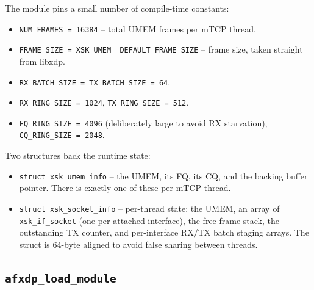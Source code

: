 \documentclass[10pt, letterpaper, twocolumn]{article}
\begin{document}
The module pins a small number of compile-time constants:
\begin{itemize}
    \item \texttt{NUM\_FRAMES = 16384} -- total UMEM frames per mTCP thread.
    \item \texttt{FRAME\_SIZE = XSK\_UMEM\_\_DEFAULT\_FRAME\_SIZE} -- frame size, taken straight from libxdp.
    \item \texttt{RX\_BATCH\_SIZE = TX\_BATCH\_SIZE = 64}.
    \item \texttt{RX\_RING\_SIZE = 1024}, \texttt{TX\_RING\_SIZE = 512}.
    \item \texttt{FQ\_RING\_SIZE = 4096} (deliberately large to avoid RX starvation), \texttt{CQ\_RING\_SIZE = 2048}.
\end{itemize}
Two structures back the runtime state:
\begin{itemize}
    \item \texttt{struct xsk\_umem\_info} -- the UMEM, its FQ, its CQ, and the backing buffer pointer. There is exactly one of these per mTCP thread.
    \item \texttt{struct xsk\_socket\_info} -- per-thread state: the UMEM, an array of \texttt{xsk\_if\_socket} (one per attached interface), the free-frame stack, the outstanding TX counter, and per-interface RX/TX batch staging arrays. The struct is 64-byte aligned to avoid false sharing between threads.
\end{itemize}

\subsection{\texttt{afxdp\_load\_module}}
\end{document}
